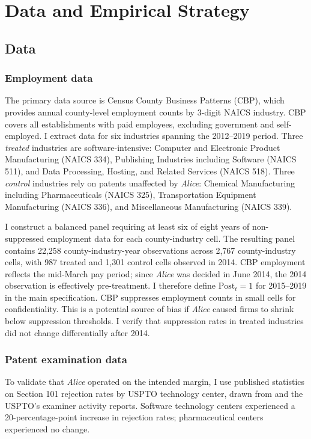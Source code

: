 \documentclass[12pt]{article}
\begin{document}
\section{Data and Empirical Strategy}

\subsection{Data}

\subsubsection*{Employment data} The primary data source is Census County Business Patterns (CBP), which provides annual county-level employment counts by 3-digit NAICS industry. CBP covers all establishments with paid employees, excluding government and self-employed. I extract data for six industries spanning the 2012--2019 period. Three \emph{treated} industries are software-intensive: Computer and Electronic Product Manufacturing (NAICS 334), Publishing Industries including Software (NAICS 511), and Data Processing, Hosting, and Related Services (NAICS 518). Three \emph{control} industries rely on patents unaffected by \textit{Alice}: Chemical Manufacturing including Pharmaceuticals (NAICS 325), Transportation Equipment Manufacturing (NAICS 336), and Miscellaneous Manufacturing (NAICS 339).

I construct a balanced panel requiring at least six of eight years of non-suppressed employment data for each county-industry cell. The resulting panel contains 22,258 county-industry-year observations across 2,767 county-industry cells, with 987 treated and 1,301 control cells observed in 2014. CBP employment reflects the mid-March pay period; since \textit{Alice} was decided in June 2014, the 2014 observation is effectively pre-treatment. I therefore define $\text{Post}_t = 1$ for 2015--2019 in the main specification. CBP suppresses employment counts in small cells for confidentiality. This is a potential source of bias if \textit{Alice} caused firms to shrink below suppression thresholds. I verify that suppression rates in treated industries did not change differentially after 2014.

\subsubsection*{Patent examination data} To validate that \textit{Alice} operated on the intended margin, I use published statistics on Section 101 rejection rates by USPTO technology center, drawn from \citet{allison2015patent} and the USPTO's examiner activity reports. Software technology centers experienced a 20-percentage-point increase in rejection rates; pharmaceutical centers experienced no change.
\end{document}
